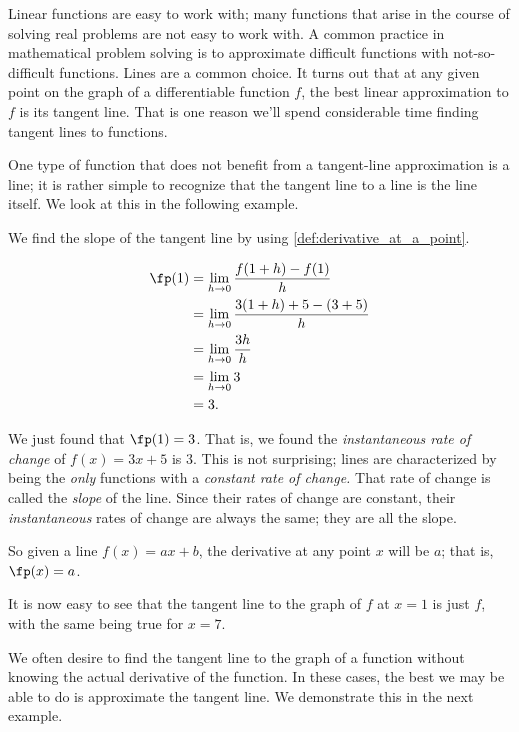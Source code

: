 Linear functions are easy to work with; many functions that arise in the course of solving real problems are not easy to work with. A common practice in mathematical problem solving is to approximate difficult functions with not-so-difficult functions. Lines are a common choice. It turns out that at any given point on the graph of a differentiable function $f$, the best linear approximation to $f$ is its tangent line. That is one reason we'll spend considerable time finding tangent lines to functions.

One type of function that does not benefit from a tangent-line approximation is a line; it is rather simple to recognize that the tangent line to a line is the line itself. We look at this in the following example.

{We find the slope of the tangent line by using \autoref{def:derivative_at_a_point}.

	\begin{align*}
	\fp(1) &=	\lim_{h\to 0}\frac{f(1+h)-f(1)}{h} \\
					&=	\lim_{h\to 0} \frac{3(1+h)+5 - (3+5)}{h}\\
					&=	\lim_{h\to 0} \frac{3h}{h}\\
					&=	\lim_{h\to 0} 3\\
					&= 3.
	\end{align*}
	
We just found that $\fp(1) = 3$. That is, we found the \textit{instantaneous rate of change} of $f(x) = 3x+5$ is $3$. This is not surprising; lines are characterized by being the \textit{only} functions with a \textit{constant rate of change.} That rate of change is called the \textit{slope} of the line. Since their rates of change are constant, their \textit{instantaneous} rates of  change are always the same; they are all the slope.

So given a line $f(x) = ax+b$, the derivative at any point $x$ will be $a$; that is, $\fp(x) = a$. 

It is now easy to see that the tangent line to the graph of $f$ at $x=1$ is just $f$, with the same being true for $x=7$.}

We often desire to find the tangent line to the graph of a function without knowing the actual derivative of the function. In these cases, the best we may be able to do is approximate the tangent line. We demonstrate this in the next example.


